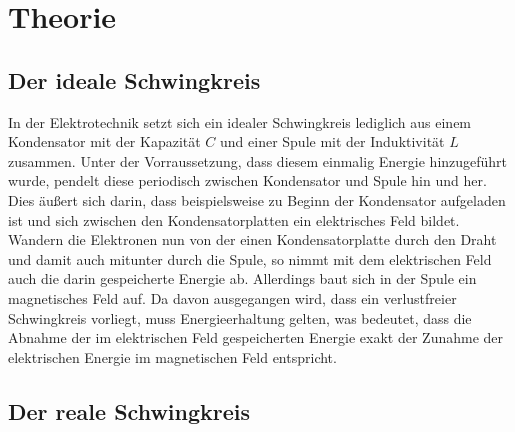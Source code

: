 \section{Theorie}
\label{sec:Theorie}

\subsection{Der ideale Schwingkreis}

In der Elektrotechnik setzt sich ein idealer Schwingkreis lediglich aus einem Kondensator mit der
Kapazität $C$ und einer Spule mit der Induktivität $L$ zusammen. Unter der Vorraussetzung, dass
diesem einmalig Energie hinzugeführt wurde, pendelt diese periodisch zwischen Kondensator und
Spule hin und her. Dies äußert sich darin, dass beispielsweise zu Beginn der Kondensator 
aufgeladen ist und sich zwischen den Kondensatorplatten ein elektrisches Feld bildet. Wandern 
die Elektronen nun von der einen Kondensatorplatte durch den Draht und damit auch mitunter durch 
die Spule, so nimmt mit dem elektrischen Feld auch die darin gespeicherte Energie ab. Allerdings
baut sich in der Spule ein magnetisches Feld auf. Da davon ausgegangen wird, dass ein verlustfreier
Schwingkreis vorliegt, muss Energieerhaltung gelten, was bedeutet, dass die Abnahme der im elektrischen
Feld gespeicherten Energie exakt der Zunahme der elektrischen Energie im magnetischen Feld entspricht.

\subsection{Der reale Schwingkreis}

